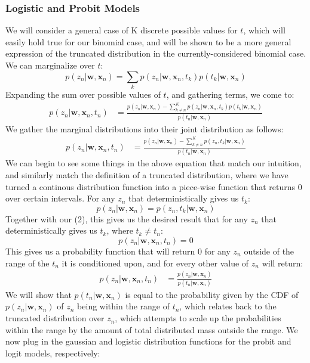\documentclass[a4paper,12pt]{article}
\begin{document}
\subsubsection*{Logistic and Probit Models}
%
We will consider a general case of K discrete possible values for $t$, which will easily hold true for our binomial case, and will be shown to be a more general expression of the truncated distribution in the currently-considered binomial case. We can marginalize over $t$:
%
$$
p(z_n | \bm{w}, \bm{x}_n) = \sum_k p(z_n | \bm{w}, \bm{x}_n, t_k)p(t_k | \bm{w}, \bm{x}_n)
$$
%
Expanding the sum over possible values of $t$, and gathering terms, we come to:
%
\begin{align*}
p(z_n | \bm{w}, \bm{x}_n, t_n) &= \frac{p(z_n | \bm{w}, \bm{x}_n) - \sum_{k \neq n}^K p(z_n | \bm{w}, \bm{x}_n, t_k)p(t_k | \bm{w}, \bm{x}_n)}{p(t_n | \bm{w}, \bm{x}_n)}
\end{align*}
%
We gather the marginal distributions into their joint distribution as follows:
%
\begin{align}
p(z_n | \bm{w}, \bm{x}_n, t_n) &= \frac{p(z_n | \bm{w}, \bm{x}_n) - \sum_{k \neq n}^K p(z_n, t_k | \bm{w}, \bm{x}_n)}{p(t_n | \bm{w}, \bm{x}_n)}
\end{align}
%
We can begin to see some things in the above equation that match our intuition, and similarly match the definition of a truncated distribution, where we have turned a continous distribution function into a piece-wise function that returns 0 over certain intervals. For any $z_n$ that deterministically gives us $t_k$:
%
$$
p(z_n | \bm{w}, \bm{x}_n) = p(z_n, t_k | \bm{w}, \bm{x}_n)
$$
%
Together with our (2), this gives us the desired result that for any $z_n$ that deterministically gives us $t_k$, where $t_k \neq t_n$:
%
$$
p(z_n | \bm{w}, \bm{x}_n, t_n) = 0
$$
%
This gives us a probability function that will return 0 for any $z_n$ outside of the range of the $t_n$ it is conditioned upon, and for every other value of $z_n$ will return:
%
\begin{align}
p(z_n | \bm{w}, \bm{x}_n, t_n) &= \frac{p(z_n | \bm{w}, \bm{x}_n)}{p(t_n | \bm{w}, \bm{x}_n)}
\end{align}
%
We will show that $p(t_n | \bm{w}, \bm{x}_n)$ is equal to the probability given by the CDF of $p(z_n | \bm{w}, \bm{x}_n)$ of $z_n$ being within the range of $t_n$, which relates back to the truncated distribution over $z_n$, which attempts to scale up the probabilities within the range by the amount of total distributed mass outside the range. We now plug in the gaussian and logistic distribution functions for the probit and logit models, respectively:
\end{document}
